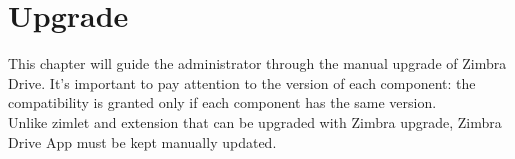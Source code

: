 \chapter{Upgrade}\label{==cha:upgrade==}
This chapter will guide the administrator through the manual upgrade of Zimbra Drive.
It's important to pay attention to the version of each component: the compatibility is granted 
only if each component has the same version.\\ 
Unlike zimlet and extension that can be upgraded with Zimbra upgrade, Zimbra Drive App must be kept manually updated.



%
